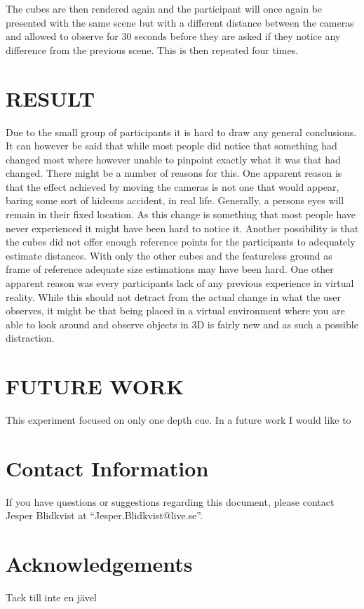 \documentclass[tog]{acmsiggraph}
\begin{document}
The cubes are then rendered again and the participant will once again be presented with the same scene but with a different distance between the cameras and allowed to observe for 30 seconds before they are asked if they notice any difference from the previous scene. This is then repeated four times.


\section{RESULT}

Due to the small group of participants it is hard to draw any general conclusions. It can however be said that while most people did notice that something had changed most where however unable to pinpoint exactly what it was that had changed. There might be a number of reasons for this. One apparent reason is that the effect achieved by moving the cameras is not one that would appear, baring some sort of hideous accident, in real life. Generally, a persons eyes will remain in their fixed location. As this change is something that most people have never experienced it might have been hard to notice it. Another possibility is that the cubes did not offer enough reference points for the participants to adequately estimate distances. With only the other cubes and the featureless ground as frame of reference adequate size estimations may have been hard. One other apparent reason was every participants lack of any previous experience in virtual reality. While this should not detract from the actual change in what the user observes, it might be that being placed in a virtual environment where you are able to look around and observe objects in 3D is fairly new and as such a possible distraction.  

\section{FUTURE WORK}

This experiment focused on only one depth cue. In a future work I would like to 




\section{Contact Information}

If you have questions or suggestions regarding this document, please
contact Jesper Blidkvist at ``Jesper.Blidkvist@live.se''.

\section*{Acknowledgements}

Tack till inte en jävel


\nocite{*}

\end{document}
